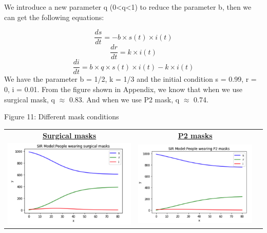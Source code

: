 \documentclass[11pt,a4paper]{article}
\begin{document}
\medskip \noindent
We introduce a new parameter q (0<q<1) to reduce the parameter b, then we can get the following equations:

$$\frac{ds}{dt} = -b \times s(t) \times i(t)$$
$$\frac{dr}{dt} = k \times i(t)$$
$$\frac{di}{dt} =  b \times q \times s(t) \times i(t) - k \times i(t)$$
\noindent
We have the parameter b = 1/2, k = 1/3 and the initial condition s = 0.99, r = 0, i = 0.01. From the figure shown in Appendix, we know that when we use surgical mask, q $\approx$ 0.83. And when we use P2 mask, q $\approx$ 0.74.





  \begin{center}
 	Figure 11: Different mask conditions
 \end{center}
 \begin{center}
 	
 	\begin{tabular}{c c c}
 		\textbf{\underline{Surgical masks}} &
 		\textbf{\underline{P2 masks}}  \\
 		\includegraphics[width=.5\textwidth]{surgmask.png} & \includegraphics[width=.5\textwidth]{p2mask.png}
 	\end{tabular}
 
 \end{center}
\end{document}
